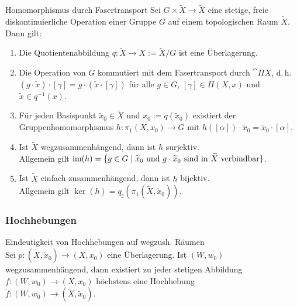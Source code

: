 \begin{Satz}{Homomorphismus durch Fasertransport}
    Sei $G \times \widetilde{X} \rightarrow \widetilde{X}$ eine stetige, freie
    diskontinuierliche Operation einer Gruppe $G$ auf einem topologischen Raum
    $\widetilde{X}$. Dann gilt:
    \begin{enumerate}
        \item
        Die Quotientenabbildung
        $q\colon \widetilde{X} \rightarrow X := \widetilde{X}/G$
        ist eine Überlagerung.

        \item
        Die Operation von $G$ kommutiert mit dem Fasertransport durch
        $\cat{\Pi X}$, d.\,h. \\
        $(g \cdot \widetilde{x}) \cdot [\gamma] =
        g \cdot (\widetilde{x} \cdot [\gamma])$
        für alle $g \in G$, $[\gamma] \in \Pi(X, x)$ und
        $\widetilde{x} \in q^{-1}(x)$.

        \item
        Für jeden Basispunkt $\widetilde{x}_0 \in \widetilde{X}$ und
        $x_0 := q(\widetilde{x}_0)$ existiert der Gruppenhomomorphismus
        $h\colon \pi_1(X, x_0) \rightarrow G$ mit
        $h([\alpha]) \cdot \widetilde{x}_0 = \widetilde{x}_0 \cdot [\alpha]$.

        \item
        Ist $\widetilde{X}$ wegzusammenhängend, dann ist $h$ surjektiv. \\
        Allgemein gilt $\text{im}(h) = \{g \in G \;|\; \widetilde{x}_0 \text{ und }
        g \cdot \widetilde{x}_0 \text{ sind in } \widetilde{X}
        \text{ verbindbar}\}$.

        \item
        Ist $\widetilde{X}$ einfach zusammenhängend, dann ist $h$ bijektiv. \\
        Allgemein gilt
        $\ker(h) = q_\sharp(\pi_1(\widetilde{X}, \widetilde{x}_0))$.
    \end{enumerate}
\end{Satz}

\pagebreak

\subsubsection{%
    Hochhebungen%
}

\begin{Satz}{Eindeutigkeit von Hochhebungen auf wegzush. Räumen}\\
    Sei $p\colon (\widetilde{X}, \widetilde{x}_0) \rightarrow (X, x_0)$
    eine Überlagerung.
    Ist $(W, w_0)$ wegzusammenhängend, dann existiert zu jeder stetigen
    Abbildung $f\colon (W, w_0) \rightarrow (X, x_0)$
    höchstens eine Hochhebung \\
    $\widetilde{f}\colon (W, w_0) \rightarrow
    (\widetilde{X}, \widetilde{x}_0)$.
\end{Satz}

